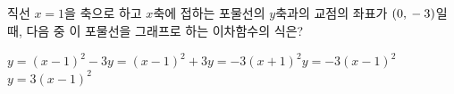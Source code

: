 직선 $x=1$을 축으로 하고 $x$축에 접하는 포물선의 $y$축과의 교점의 좌표가 $(0{,}\mkern3mu -3)$일 때, 다음 중 이 포물선을 그래프로 하는 이차함수의 식은?
\begin{choicesii}{$y=(x-1)^2-3$}{$y=(x-1)^2+3$}{$y=-3(x+1)^2$}{$y=-3(x-1)^2$}{$y=3(x-1)^2$}\end{choicesii}

